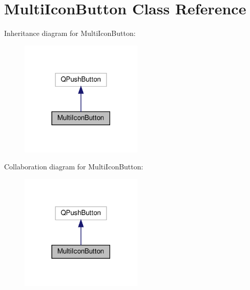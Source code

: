 \hypertarget{classMultiIconButton}{}\section{Multi\+Icon\+Button Class Reference}
\label{classMultiIconButton}


Inheritance diagram for Multi\+Icon\+Button\+:\nopagebreak
\begin{figure}[H]
\begin{center}
\leavevmode
\includegraphics[width=165pt]{classMultiIconButton__inherit__graph}
\end{center}
\end{figure}


Collaboration diagram for Multi\+Icon\+Button\+:\nopagebreak
\begin{figure}[H]
\begin{center}
\leavevmode
\includegraphics[width=165pt]{classMultiIconButton__coll__graph}
\end{center}
\end{figure}
